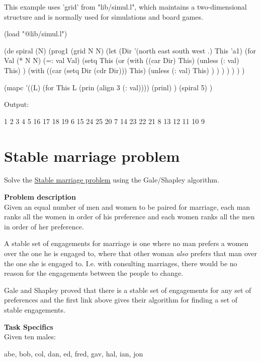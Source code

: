 \begin{wideverbatim}

This example uses 'grid' from "lib/simul.l", which maintains a two-dimensional
structure and is normally used for simulations and board games.

(load "@lib/simul.l")

(de spiral (N)
   (prog1 (grid N N)
      (let (Dir '(north east south west .)  This 'a1)
         (for Val (* N N)
            (=: val Val)
            (setq This
               (or
                  (with ((car Dir) This)
                     (unless (: val) This) )
                  (with ((car (setq Dir (cdr Dir))) This)
                     (unless (: val) This) ) ) ) ) ) ) )

(mapc
   '((L)
      (for This L (prin (align 3 (: val))))
      (prinl) )
   (spiral 5) )

Output:

  1  2  3  4  5
 16 17 18 19  6
 15 24 25 20  7
 14 23 22 21  8
 13 12 11 10  9

\end{wideverbatim}

\pagebreak{}
\section*{Stable marriage problem}


Solve the
\href{http://en.wikipedia.org/wiki/Stable\_marriage\_problem}{Stable
  marriage problem} using the Gale/Shapley algorithm.

\textbf{Problem description}\\ Given an equal number of men and women to
be paired for marriage, each man ranks all the women in order of his
preference and each women ranks all the men in order of her preference.

A stable set of engagements for marriage is one where no man prefers a
women over the one he is engaged to, where that other woman \emph{also}
prefers that man over the one she is engaged to. I.e. with consulting
marriages, there would be no reason for the engagements between the
people to change.

Gale and Shapley proved that there is a stable set of engagements for
any set of preferences and the first link above gives their algorithm
for finding a set of stable engagements.

\pagebreak{}
\textbf{Task Specifics}\\ Given ten males:

\begin{wideverbatim}
   abe, bob, col, dan, ed, fred, gav, hal, ian, jon
\end{wideverbatim}


